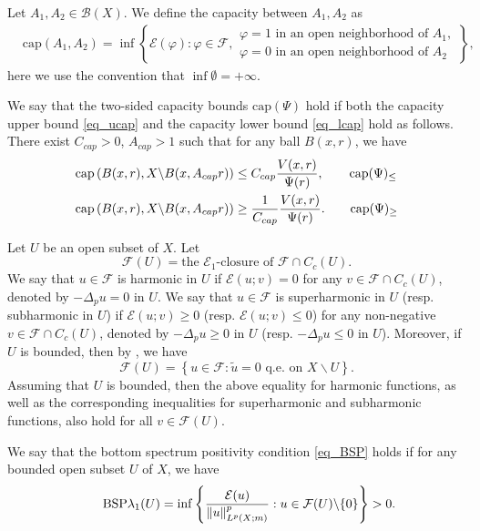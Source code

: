\documentclass[11pt,a4paper]{article}
\numberwithin{equation}{section}
\theoremstyle{plain}
\theoremstyle{definition}
\begin{document}
Let $A_1,A_2\in\mathcal{B}(X)$. We define the capacity between $A_1,A_2$ as
\begin{align*}
&\mathrm{cap}(A_1,A_2)=\inf\left\{\mathcal{E}(\varphi):\varphi\in\mathcal{F},
\begin{array}{l}
\varphi=1\text{ in an open neighborhood of }A_1,\\
\varphi=0\text{ in an open neighborhood of }A_2
\end{array}
\right\},
\end{align*}
here we use the convention that $\inf\emptyset=+\infty$.

We say that the two-sided capacity bounds \hypertarget{eq_cap}{$\text{cap}(\Psi)$} hold if both the capacity upper bound \ref{eq_ucap} and the capacity lower bound \ref{eq_lcap} hold as follows. There exist $C_{cap}>0$, $A_{cap}>1$ such that for any ball $B(x,r)$, we have
\begin{align*}
\mathrm{cap}\left(B(x,r),X\backslash B(x,A_{cap}r)\right)&\le C_{cap} \frac{V(x,r)}{\Psi(r)},\label{eq_ucap}\tag*{$\text{cap}(\Psi)_{\le}$}\\
\mathrm{cap}\left(B(x,r),X\backslash B(x,A_{cap}r)\right)&\ge \frac{1}{C_{cap}} \frac{V(x,r)}{\Psi(r)}.\label{eq_lcap}\tag*{$\text{cap}(\Psi)_{\ge}$}
\end{align*}

Let $U$ be an open subset of $X$. Let
$$\mathcal{F}(U)=\text{the }\mathcal{E}_1\text{-closure of }\mathcal{F}\cap C_c(U).$$
We say that $u\in\mathcal{F}$ is harmonic in $U$ if $\mathcal{E}(u;v)=0$ for any $v\in\mathcal{F}\cap C_c(U)$, denoted by $-\Delta_pu=0$ in $U$. We say that $u\in\mathcal{F}$ is superharmonic in $U$ (resp. subharmonic in $U$) if $\mathcal{E}(u;v)\ge0$ (resp. $\mathcal{E}(u;v)\le0$) for any non-negative $v\in\mathcal{F}\cap C_c(U)$, denoted by $-\Delta_pu\ge0$ in $U$ (resp. $-\Delta_pu\le0$ in $U$). Moreover, if $U$ is bounded, then by \cite[Lemma 6.2]{Yan25c}, we have
$$\mathcal{F}(U)=\left\{u\in\mathcal{F}:\widetilde{u}=0\text{ q.e. on }X\backslash U\right\}.$$
Assuming that $U$ is bounded, then the above equality for harmonic functions, as well as the corresponding inequalities for superharmonic and subharmonic functions, also hold for all $v\in\mathcal{F}(U)$.

We say that the bottom spectrum positivity condition \ref{eq_BSP} holds if for any bounded open subset $U$ of $X$, we have
\begin{equation*}\label{eq_BSP}\tag*{\text{BSP}}
\lambda_1(U)=\inf \left\{\frac{\mathcal{E}(u)}{\lVert u\rVert_{L^p(X;m)}^p}:u\in \mathcal{F}(U)\backslash \{0\}\right\}>0.
\end{equation*}
\end{document}

